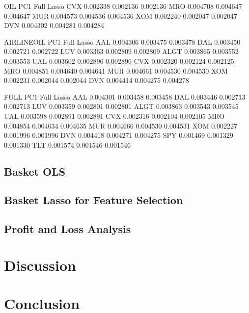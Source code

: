 \documentclass{article}
\begin{document}
OIL
PC1	Full	Lasso
CVX	0.002338	0.002136	0.002136
MRO	0.004708	0.004647	0.004647
MUR	0.004573	0.004536	0.004536
XOM	0.002240	0.002047	0.002047
DVN	0.004302	0.004281	0.004284

AIRLINEOIL
PC1	Full	Lasso
AAL	0.004306	0.003475	0.003478
DAL	0.003450	0.002721	0.002722
LUV	0.003363	0.002809	0.002809
ALGT	0.003865	0.003552	0.003553
UAL	0.003602	0.002896	0.002896
CVX	0.002320	0.002124	0.002125
MRO	0.004851	0.004640	0.004641
MUR	0.004661	0.004530	0.004530
XOM	0.002231	0.002044	0.002044
DVN	0.004414	0.004275	0.004278

FULL
PC1	Full	Lasso
AAL	0.004301	0.003458	0.003458
DAL	0.003446	0.002713	0.002713
LUV	0.003359	0.002801	0.002801
ALGT	0.003863	0.003543	0.003545
UAL	0.003598	0.002891	0.002891
CVX	0.002316	0.002104	0.002105
MRO	0.004854	0.004634	0.004635
MUR	0.004666	0.004530	0.004531
XOM	0.002227	0.001996	0.001996
DVN	0.004418	0.004271	0.004275
SPY	0.001469	0.001329	0.001330
TLT	0.001574	0.001546	0.001546
\subsection{Basket OLS}
\subsection{Basket Lasso for Feature Selection}
\subsection{Profit and Loss Analysis}

\section{Discussion}

\section{Conclusion}
\end{document}
